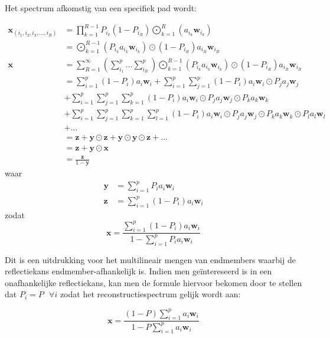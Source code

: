 \documentclass[12pt]{report}
\DeclareMathOperator*{\Odot}{\bigodot}
\begin{document}
Het spectrum afkomstig van een specifiek pad wordt:

\begin{align}
\bm{x}_{(i_1,i_2,i_3,...,i_R)} &= \prod_{k=1}^{R-1}P_{i_k} (1-P_{i_R}) \Odot_{k=1}^R \left(a_{i_k} \bm{w}_{i_k}\right) \\
&= \Odot_{k=1}^{R-1} \left(P_{i_k}a_{i_k} \bm{w}_{i_k}\right) \odot (1-P_{i_R}) a_{i_R} \bm{w}_{i_R} \\
\bm{x} &= \sum_{R=1}^{\infty} \left(\sum_{i_1}^{p} ... \sum_{i_R}^{p}\right) \Odot_{k=1}^{R-1} \left(P_{i_k}a_{i_k} \bm{w}_{i_k}\right) \odot (1-P_{i_R}) a_{i_R} \bm{w}_{i_R} \\
&= \sum_{i=1}^p (1-P_i) a_{i} \bm{w}_{i} + \sum_{i=1}^p \sum_{j=1}^p (1-P_i) a_{i} \bm{w}_{i} \odot P_j a_{j} \bm{w}_{j} \nonumber\\&+ \sum_{i=1}^p \sum_{j=1}^p \sum_{k=1}^p (1-P_i) a_{i} \bm{w}_{i} \odot P_j a_{j} \bm{w}_{j} \odot P_k a_{k} \bm{w}_{k} \nonumber\\&+ \sum_{i=1}^p \sum_{j=1}^p \sum_{k=1}^p  \sum_{l=1}^p (1-P_i) a_{i} \bm{w}_{i} \odot P_j a_{j} \bm{w}_{j} \odot P_k a_{k} \bm{w}_{k} \odot P_l a_{l} \bm{w}_{l} \nonumber \\& + ... \\
&= \bm{z} + \bm{y}\odot\bm{z} + \bm{y}\odot\bm{y}\odot\bm{z} + ... \\
&= \bm{z} + \bm{y}\odot\bm{x} \\
 &= \frac{\bm{z}}{1-\bm{y}}
\end{align}
waar
\begin{align}
\bm{y} &= \sum_{i=1}^p P_i a_{i} \bm{w}_{i} \\
\bm{z} &= \sum_{i=1}^p (1-P_i) a_{i} \bm{w}_{i} 
\end{align}
zodat
\begin{equation}
\bm{x} = \frac{\sum_{i=1}^p (1-P_i) a_{i} \bm{w}_{i}}{1-\sum_{i=1}^p P_i a_{i} \bm{w}_{i}} \label{eq:Pi}
\end{equation}

Dit is een uitdrukking voor het multilineair mengen van endmembers waarbij de reflectiekans endmember-afhankelijk is. Indien men ge\"intereseerd is in een onafhankelijke reflectiekans, kan men de formule hiervoor bekomen door te stellen dat $P_i = P \text{   }\forall i$ zodat het reconstructiespectrum gelijk wordt aan:

\begin{equation}
\bm{x} = \frac{(1-P) \sum_{i=1}^p a_{i} \bm{w}_{i}}{1-P\sum_{i=1}^p  a_{i} \bm{w}_{i}} \label{eq:P}
\end{equation}
\end{document}
